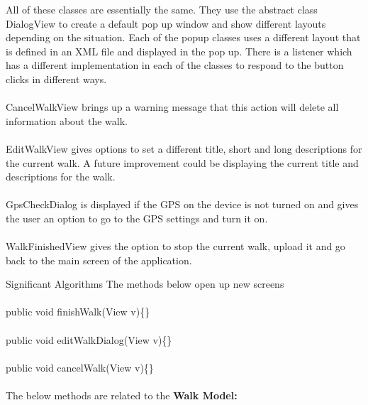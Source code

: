 \documentclass[12pt]{article}
\makeatletter
\renewcommand{\paragraph}{
  \@startsection{paragraph}{4}
  {\z@}{3.25ex \@plus -10em \@minus 1em}{0.1em}
  {\normalfont\normalsize\bfseries}
}
\makeatother
\begin{document}
All of these classes are essentially the same. They use the abstract class DialogView to create a default pop up window and show different layouts depending on the situation. Each of the popup classes uses a different layout that is defined in an XML file and displayed in the pop up. There is a listener which has a different implementation in each of the classes to respond to the button clicks in different ways.
~\\\\
CancelWalkView brings up a warning message that this action will delete all information about the walk.
~\\\\
EditWalkView gives options to set a different title, short and long descriptions for the current walk. A future improvement could be displaying the current title and descriptions for the walk.
~\\\\
GpsCheckDialog is displayed if the GPS on the device is not turned on and gives the user an option to go to the GPS settings and turn it on.
~\\\\
WalkFinishedView gives the option to stop the current walk, upload it and go back to the main screen of the application.
\paragraph{Significant Algorithms}
The methods below open up new screens
\\\\
public void finishWalk(View v)\{\}
\\\\
public void editWalkDialog(View v)\{\}
\\\\
public void cancelWalk(View v)\{\}
~\\\\
The below methods are related to the \textbf{Walk Model:}
\end{document}
